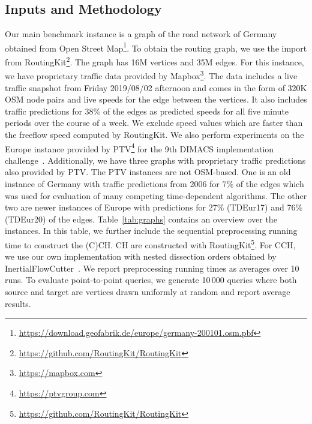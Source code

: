 \documentclass[manuscript,review]{acmart}
\begin{document}
\subsection{Inputs and Methodology}
Our main benchmark instance is a graph of the road network of Germany obtained from Open Street Map\footnote{\url{https://download.geofabrik.de/europe/germany-200101.osm.pbf}}.
To obtain the routing graph, we use the import from RoutingKit\footnote{\url{https://github.com/RoutingKit/RoutingKit}}.
The graph has 16M vertices and 35M edges.
For this instance, we have proprietary traffic data provided by Mapbox\footnote{\url{https://mapbox.com}}.
The data includes a live traffic snapshot from Friday 2019/08/02 afternoon and comes in the form of 320K OSM node pairs and live speeds for the edge between the vertices.
It also includes traffic predictions for 38\% of the edges as predicted speeds for all five minute periods over the course of a week.
We exclude speed values which are faster than the freeflow speed computed by RoutingKit.
We also perform experiments on the Europe instance provided by PTV\footnote{\url{https://ptvgroup.com}} for the 9th DIMACS implementation challenge~\cite{DemetrescuGJ09}.
Additionally, we have three graphs with proprietary traffic predictions also provided by PTV.
The PTV instances are not OSM-based.
One is an old instance of Germany with traffic predictions from 2006 for 7\% of the edges which was used for evaluation of many competing time-dependent algorithms.
The other two are newer instances of Europe with predictions for 27\% (TDEur17) and 76\% (TDEur20) of the edges.
Table~\ref{tab:graphs} contains an overview over the instances.
In this table, we further include the sequential preprocessing running time to construct the (C)CH.
CH are constructed with RoutingKit\footnote{\url{https://github.com/RoutingKit/RoutingKit}}.
For CCH, we use our own implementation with nested dissection orders obtained by InertialFlowCutter~\cite{GottesburenHUW19}.
We report preprocessing running times as averages over 10 runs.
To evaluate point-to-point queries, we generate 10\,000 queries where both source and target are vertices drawn uniformly at random and report average results.
\end{document}
